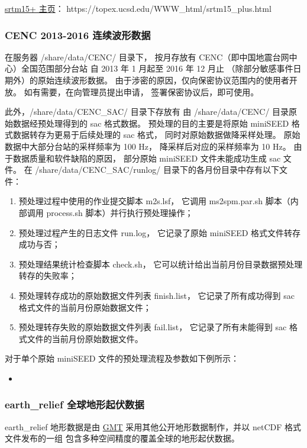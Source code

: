 \documentclass[UTF8]{ctexart}
\newcommand{\mynote}[1]{\colorbox{gray!35}{#1}}
\newcommand{\insertbash}[2]{\begin{itemize}\item[]\end{itemize}}
\begin{document}
\href{https://topex.ucsd.edu/WWW_html/srtm15_plus.html}{srtm15+ 主页}：
https://topex.ucsd.edu/WWW\_html/srtm15\_plus.html

\subsubsection{CENC 2013-2016 连续波形数据}
在服务器 /share/data/CENC/ 目录下，
按月存放有 CENC（即中国地震台网中心）全国范围部分台站
自 2013 年 1 月起至 2016 年 12 月止
（除部分敏感事件日期外）的原始连续波形数据。
由于涉密的原因，仅向保密协议范围内的使用者开放。
如有需要，在向管理员提出申请，
签署保密协议后，即可使用。

此外，/share/data/CENC\_SAC/ 目录下存放有
由 /share/data/CENC/ 目录原始数据经预处理得到的 sac 格式数据。
预处理的目的主要是将原始 miniSEED 格式数据转存为更易于后续处理的 sac 格式，
同时对原始数据做降采样处理。
原始数据中大部分台站的采样频率为 100 Hz，
降采样后对应的采样频率为 10 Hz。
由于数据质量和软件缺陷的原因，
部分原始 miniSEED 文件未能成功生成 sac 文件。
在 /share/data/CENC\_SAC/runlog/ 目录下的各月份目录中存有以下文件：
\begin{enumerate}[\hspace{15mm}（1）]
  \item 预处理过程中使用的作业提交脚本 \mynote{m2s.lsf}，
    它调用 ms2spm.par.sh 脚本（内部调用 process.sh 脚本）并行执行预处理操作；
  \item 预处理过程产生的日志文件 \mynote{run.log}，
    它记录了原始 miniSEED 格式文件转存成功与否；
  \item 预处理结果统计检查脚本 \mynote{check.sh}，
    它可以统计给出当前月份目录数据预处理转存的失败率；
  \item 预处理转存成功的原始数据文件列表 \mynote{finish.list}，
    它记录了所有成功得到 sac 格式文件的当前月份原始数据文件；
  \item 预处理转存失败的原始数据文件列表 \mynote{fail.list}，
    它记录了所有未能得到 sac 格式文件的当前月份原始数据文件。
\end{enumerate}

对于单个原始 miniSEED 文件的预处理流程及参数如下例所示：
\insertbash{material/cencpp.sh}{CENC 波形数据预处理示例}

\subsubsection{earth\_relief 全球地形起伏数据}
earth\_relief 地形数据是由 \href{https://www.generic-mapping-tools.org}{GMT} 
采用其他公开地形数据制作，并以 netCDF 格式文件发布的一组
包含多种空间精度的覆盖全球的地形起伏数据。
\end{document}
